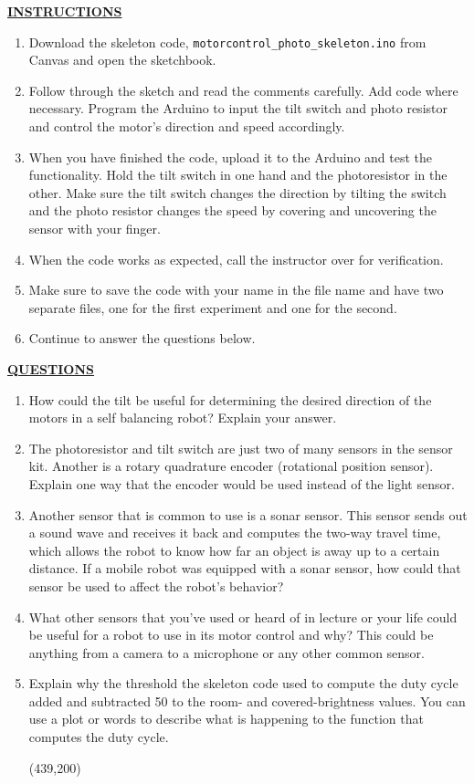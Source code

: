 \documentclass[12pt]{article}
\begin{document}
\textbf{\underline{INSTRUCTIONS}}
\begin{enumerate}
    \item Download the skeleton code, \texttt{motorcontrol\_photo\_skeleton.ino} from Canvas and open the sketchbook.
    \item Follow through the sketch and read the comments carefully. Add code where necessary. Program the Arduino to input the tilt switch and photo resistor and control the motor's direction and speed accordingly. 
    \item When you have finished the code, upload it to the Arduino and test the functionality. Hold the tilt switch in one hand and the photoresistor in the other. Make sure the tilt switch changes the direction by tilting the switch and the photo resistor changes the speed by covering and uncovering the sensor with your finger.
    \item When the code works as expected, call the instructor over for verification.
    \item Make sure to save the code with your name in the file name and have two separate files, one for the first experiment and one for the second.
    \item Continue to answer the questions below.
\end{enumerate}

\textbf{\underline{QUESTIONS}}
\begin{enumerate}
    \item How could the tilt be useful for determining the desired direction of the motors in a self balancing robot? Explain your answer.
        \fillwithlines{1in}
        
    \item The photoresistor and tilt switch are just two of many sensors in the sensor kit. Another is a rotary quadrature encoder (rotational position sensor).  Explain one way that the encoder would be used instead of the light sensor.
        \fillwithlines{1in}
        
    \item Another sensor that is common to use is a sonar sensor. This sensor sends out a sound wave and receives it back and computes the two-way travel time, which allows the robot to know how far an object is away up to a certain distance. If a mobile robot was equipped with a sonar sensor, how could that sensor be used to affect the robot's behavior?
        \fillwithlines{1in}
\newpage
    \item What other sensors that you've used or heard of in lecture or your life could be useful for a robot to use in its motor control and why? This could be anything from a camera to a microphone or any other common sensor.
        \fillwithlines{1in}
        
    \item Explain why the threshold the skeleton code used to compute the duty cycle added and subtracted 50 to the room- and covered-brightness values. You can use a plot or words to describe what is happening to the function that computes the duty cycle.
    
        \framebox(439,200){}
        
\end{enumerate}
\end{document}
